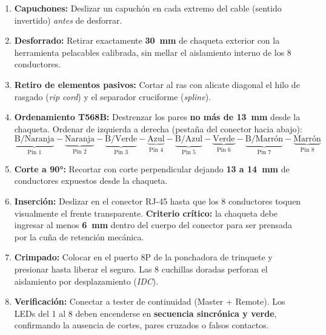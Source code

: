 \begin{enumerate}[leftmargin=*, label=\textbf{Paso \arabic*.}]
    \item \textbf{Capuchones:} Deslizar un capuchón en cada extremo del cable (sentido invertido) \textit{antes} de desforrar.
    
    \item \textbf{Desforrado:} Retirar exactamente \textbf{30~mm} de chaqueta exterior con la herramienta pelacables calibrada, sin mellar el aislamiento interno de los 8 conductores.
    
    \item \textbf{Retiro de elementos pasivos:} Cortar al ras con alicate diagonal el hilo de rasgado (\textit{rip cord}) y el separador cruciforme (\textit{spline}).
    
    \item \textbf{Ordenamiento T568B:} Destrenzar los pares \textbf{no más de 13~mm} desde la chaqueta. Ordenar de izquierda a derecha (pestaña del conector hacia abajo):
    \begin{equation*}
        \underbrace{\text{B/Naranja}}_{\text{Pin 1}} - \underbrace{\text{Naranja}}_{\text{Pin 2}} - \underbrace{\text{B/Verde}}_{\text{Pin 3}} - \underbrace{\text{Azul}}_{\text{Pin 4}} - \underbrace{\text{B/Azul}}_{\text{Pin 5}} - \underbrace{\text{Verde}}_{\text{Pin 6}} - \underbrace{\text{B/Marrón}}_{\text{Pin 7}} - \underbrace{\text{Marrón}}_{\text{Pin 8}}
    \end{equation*}
    
    \item \textbf{Corte a 90°:} Recortar con corte perpendicular dejando \textbf{13 a 14~mm} de conductores expuestos desde la chaqueta.
    
    \item \textbf{Inserción:} Deslizar en el conector RJ-45 hasta que los 8 conductores toquen visualmente el frente transparente. \textbf{Criterio crítico:} la chaqueta debe ingresar al menos \textbf{6~mm} dentro del cuerpo del conector para ser prensada por la cuña de retención mecánica.
    
    \item \textbf{Crimpado:} Colocar en el puerto 8P de la ponchadora de trinquete y presionar hasta liberar el seguro. Las 8 cuchillas doradas perforan el aislamiento por desplazamiento (\textit{IDC}).
    
    \item \textbf{Verificación:} Conectar a tester de continuidad (Master + Remote). Los LEDs del 1 al 8 deben encenderse en \textbf{secuencia sincrónica y verde}, confirmando la ausencia de cortes, pares cruzados o falsos contactos.
\end{enumerate}

